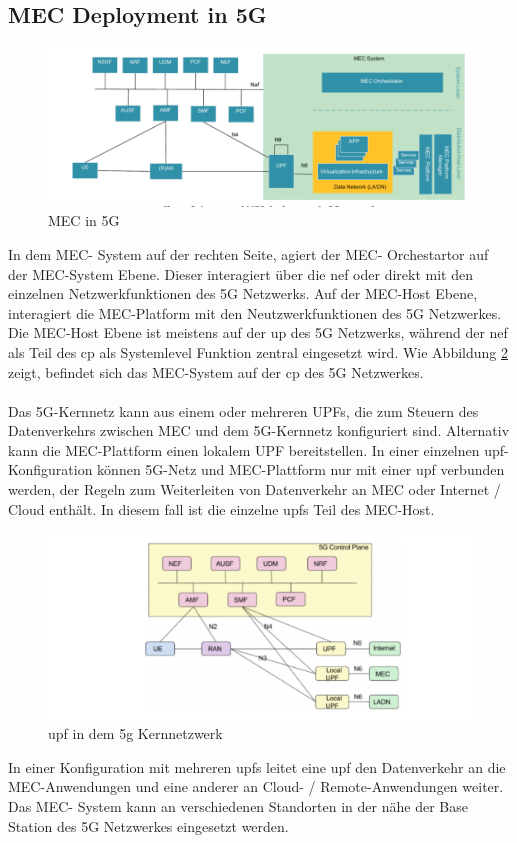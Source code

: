 \documentclass[runningheads]{llncs}
\numberwithin{figure}{section}
\begin{document}
\subsection{MEC Deployment in 5G}
\begin{figure}
  \includegraphics[width=\linewidth]{images/5GMEC-System-Architecture2.png}
  \caption{MEC in 5G}
  \label{fig:sba2}
\end{figure}
In dem MEC- System auf der rechten Seite, agiert der MEC- Orchestartor auf der MEC-System Ebene. Dieser interagiert über die \acrshort{nef} oder
direkt mit den einzelnen Netzwerkfunktionen des 5G Netzwerks. Auf der MEC-Host Ebene, interagiert die MEC-Platform mit den Neutzwerkfunktionen des 5G Netzwerkes.
Die MEC-Host Ebene ist meistens auf der \acrshort{up} des 5G Netzwerks, während der \acrshort{nef} als Teil des \acrshort{cp} als Systemlevel 
Funktion zentral eingesetzt wird.
Wie Abbildung \ref{fig:sba2} zeigt, befindet sich das MEC-System auf der \acrshort{cp} des 5G Netzwerkes. 
\\
\\
Das 5G-Kernnetz kann aus einem oder mehreren
UPFs, die zum Steuern des Datenverkehrs zwischen MEC und dem 5G-Kernnetz konfiguriert sind.
Alternativ kann die MEC-Plattform einen lokalem UPF bereitstellen.
In einer einzelnen \acrfull{upf}-Konfiguration können 5G-Netz und MEC-Plattform nur mit einer \acrfull{upf} verbunden werden, 
der Regeln zum Weiterleiten von Datenverkehr an MEC oder Internet / Cloud enthält. In diesem fall ist die einzelne \acrshort{upf}s Teil des 
MEC-Host.
\begin{figure}
  \includegraphics[width=\linewidth]{images/5g-scenarios.png}
  \caption{\acrshort{upf} in dem 5g Kernnetzwerk}
  \label{fig:sba2}
\end{figure}
In einer Konfiguration mit mehreren \acrfull{upf}s leitet eine \acrfull{upf} den Datenverkehr an die MEC-Anwendungen und 
eine anderer an Cloud- / Remote-Anwendungen weiter.
Das MEC- System kann an verschiedenen Standorten in der nähe der Base Station des 5G Netzwerkes eingesetzt werden. 
\end{document}
